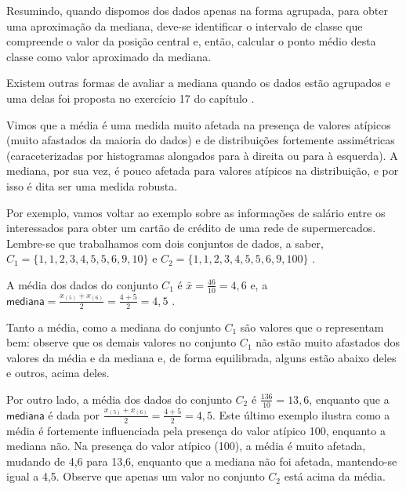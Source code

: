 Resumindo, quando dispomos dos dados apenas na forma agrupada, para obter uma aproximação da mediana, deve-se identificar o intervalo de classe que compreende o valor da posição central e, então, calcular o ponto médio desta classe como valor aproximado da mediana.

Existem outras formas de avaliar a mediana quando os dados estão agrupados e uma delas foi proposta no exercício 17 do capítulo .


Vimos que a média é uma medida muito afetada na presença de valores atípicos (muito afastados da maioria do dados) e de distribuições fortemente assimétricas (caraceterizadas por histogramas alongados para à direita ou para à esquerda). A mediana, por sua vez, é pouco afetada para valores atípicos na distribuição, e por isso é dita ser uma medida robusta.

Por exemplo, vamos voltar ao exemplo sobre as informações de salário entre os interessados para obter um cartão de crédito de uma rede de supermercados. Lembre-se que trabalhamos com dois conjuntos de dados, a saber, \(C_1=\{1, 1, 2, 3, 4, 5, 5, 6, 9, 10\}\) e \(C_2=\{1, 1, 2, 3, 4, 5, 5, 6, 9, 100\}\) .

A média dos dados do conjunto \(C_1\) é \(\bar{x}=\frac{46}{10}=4,6\) e, a \(\textsf{mediana}=\frac{x_{(5)}+x_{(6)}}{2}=\frac{4+5}{2}=4,5\) .

Tanto a média, como a mediana do conjunto \(C_1\) são valores que o representam bem: observe que os demais valores no conjunto \(C_1\) não estão muito afastados dos valores da média e da mediana e, de forma equilibrada, alguns estão abaixo deles e outros, acima deles.

Por outro lado, a média dos dados do conjunto \(C_2\) é \(\frac{136}{10}=13,6\), enquanto que a \(\textsf{mediana}\) é dada por  \(\frac{x_{(5)}+x_{(6)}}{2}=\frac{4+5}{2}=4,5\).  Este último exemplo ilustra como a média é fortemente influenciada pela presença do valor atípico 100, enquanto a mediana não.   Na presença do valor atípico (100), a média é muito afetada, mudando de 4,6 para 13,6, enquanto que a mediana não foi afetada, mantendo-se igual a 4,5.  Observe que apenas um valor no conjunto \(C_2\) está acima da média.

